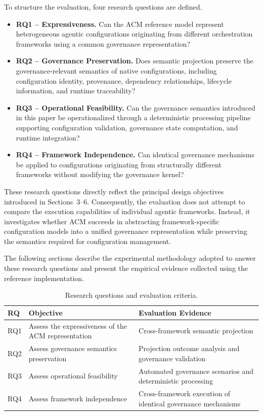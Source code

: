 \documentclass[10pt]{article}
\begin{document}
To structure the evaluation, four research questions are defined.

\begin{itemize}

\item \textbf{RQ1 -- Expressiveness.}
Can the ACM reference model represent heterogeneous agentic configurations originating from different orchestration frameworks using a common governance representation?

\item \textbf{RQ2 -- Governance Preservation.}
Does semantic projection preserve the governance-relevant semantics of native configurations, including configuration identity, provenance, dependency relationships, lifecycle information, and runtime traceability?

\item \textbf{RQ3 -- Operational Feasibility.}
Can the governance semantics introduced in this paper be operationalized through a deterministic processing pipeline supporting configuration validation, governance state computation, and runtime integration?

\item \textbf{RQ4 -- Framework Independence.}
Can identical governance mechanisms be applied to configurations originating from structurally different frameworks without modifying the governance kernel?

\end{itemize}

These research questions directly reflect the principal design objectives introduced in Sections~3--6. Consequently, the evaluation does not attempt to compare the execution capabilities of individual agentic frameworks. Instead, it investigates whether ACM succeeds in abstracting framework-specific configuration models into a unified governance representation while preserving the semantics required for configuration management.

The following sections describe the experimental methodology adopted to answer these research questions and present the empirical evidence collected using the reference implementation.

\begin{table}[ht]
\centering
\caption{Research questions and evaluation criteria.}
\label{tab:research_questions}
\begin{tabular}{p{1cm} p{4.6cm} p{5.8cm}}
\toprule
\textbf{RQ} & \textbf{Objective} & \textbf{Evaluation Evidence} \\
\midrule
RQ1 & Assess the expressiveness of the ACM representation & Cross-framework semantic projection \\
RQ2 & Assess governance semantics preservation & Projection outcome analysis and governance validation \\
RQ3 & Assess operational feasibility & Automated governance scenarios and deterministic processing \\
RQ4 & Assess framework independence & Cross-framework execution of identical governance mechanisms \\
\bottomrule
\end{tabular}
\end{table}
\end{document}
